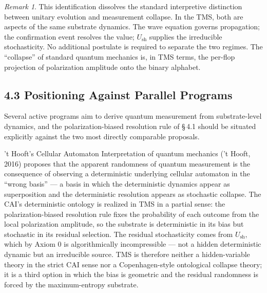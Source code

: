 \documentclass[11pt,oneside]{report}
\theoremstyle{definition}
\theoremstyle{remark}
\newtheorem{remark}[theorem]{Remark}
\begin{document}
\begin{remark}
This identification dissolves the standard interpretive
distinction between unitary evolution and measurement collapse. In the
TMS, both are aspects of the same substrate dynamics. The wave equation
governs propagation; the confirmation event resolves the value; \ensuremath{U_{\mathrm{sh}}}
supplies the irreducible stochasticity. No additional postulate is
required to separate the two regimes. The ``collapse'' of standard
quantum mechanics is, in TMS terms, the per-flop projection of
polarization amplitude onto the binary alphabet.
\end{remark}

\subsection*{4.3 Positioning Against Parallel Programs}

Several active programs aim to derive quantum measurement from
substrate-level dynamics, and the polarization-biased resolution rule of
\S\,4.1 should be situated explicitly against the two most directly
comparable proposals.

't Hooft's Cellular Automaton Interpretation of quantum mechanics ('t
Hooft, 2016) proposes that the apparent randomness of quantum
measurement is the consequence of observing a deterministic underlying
cellular automaton in the ``wrong basis'' --- a basis in which the
deterministic dynamics appear as superposition and the deterministic
resolution appears as stochastic collapse. The CAI's deterministic
ontology is realized in TMS in a partial sense: the polarization-biased
resolution rule fixes the probability of each outcome from the local
polarization amplitude, so the substrate is deterministic in its bias
but stochastic in its residual selection. The residual stochasticity
comes from \ensuremath{U_{\mathrm{sh}},} which by Axiom 0 is algorithmically incompressible ---
not a hidden deterministic dynamic but an irreducible source. TMS is
therefore neither a hidden-variable theory in the strict CAI sense nor a
Copenhagen-style ontological collapse theory; it is a third option in
which the bias is geometric and the residual randomness is forced by the
maximum-entropy substrate.
\end{document}
